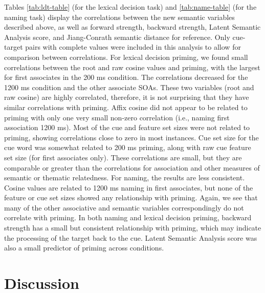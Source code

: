 \documentclass[english,,man]{apa6}
\begin{document}
Tables \ref{tab:ldt-table} (for the lexical decision task) and \ref{tab:name-table} (for the naming task) display the correlations between the new semantic variables described above, as well as forward strength, backward strength, Latent Semantic Analysis score, and Jiang-Conrath semantic distance for reference. Only cue-target pairs with complete values were included in this analysis to allow for comparison between correlations. For lexical decision priming, we found small correlations between the root and raw cosine values and priming, with the largest for first associates in the 200 ms condition. The correlations decreased for the 1200 ms condition and the other associate SOAs. These two variables (root and raw cosine) are highly correlated, therefore, it is not surprising that they have similar correlations with priming. Affix cosine did not appear to be related to priming with only one very small non-zero correlation (i.e., naming first association 1200 ms). Most of the cue and feature set sizes were not related to priming, showing correlations close to zero in most instances. Cue set size for the cue word was somewhat related to 200 ms priming, along with raw cue feature set size (for first associates only). These correlations are small, but they are comparable or greater than the correlations for association and other measures of semantic or thematic relatedness. For naming, the results are less consistent. Cosine values are related to 1200 ms naming in first associates, but none of the feature or cue set sizes showed any relationship with priming. Again, we see that many of the other associative and semantic variables correspondingly do not correlate with priming. In both naming and lexical decision priming, backward strength has a small but consistent relationship with priming, which may indicate the processing of the target back to the cue. Latent Semantic Analysis score was also a small predictor of priming across conditions.

\hypertarget{discussion}{%
\section{Discussion}\label{discussion}}
\end{document}
